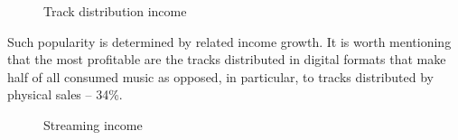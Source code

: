 \documentclass[12pt]{report}
\begin{document}
\newcommand{\slice}[4]{
  \pgfmathparse{0.5*#1+0.5*#2}
  \let\midangle\pgfmathresult

  \draw[thick,fill=black!10] (0,0) -- (#1:1) arc (#1:#2:1) -- cycle;

  \node[label=\midangle:#4] at (\midangle:1) {};

  \pgfmathparse{min((#2-#1-10)/110*(-0.3),0)}
  \let\temp\pgfmathresult
  \pgfmathparse{max(\temp,-0.5) + 0.8}
  \let\innerpos\pgfmathresult
  \node at (\midangle:\innerpos) {#3};
}

\def\Royalty{Copyright}
\def\Digital{Digital formats}
\def\Physical{Physical media}
\def\Sync{Synchronization}

\begin{figure}[H]
\centering
\caption{Track distribution income}
\end{figure}

Such popularity is determined by related income growth. It is worth mentioning that the most profitable are the tracks distributed in digital formats that make half of all consumed music as opposed, in particular, to tracks distributed by physical sales – 34\%.

\begin{figure}[H]
\centering
\caption{Streaming income}
\vspace{20pt}
\streamingPartion
{}
\end{figure}
\end{document}
